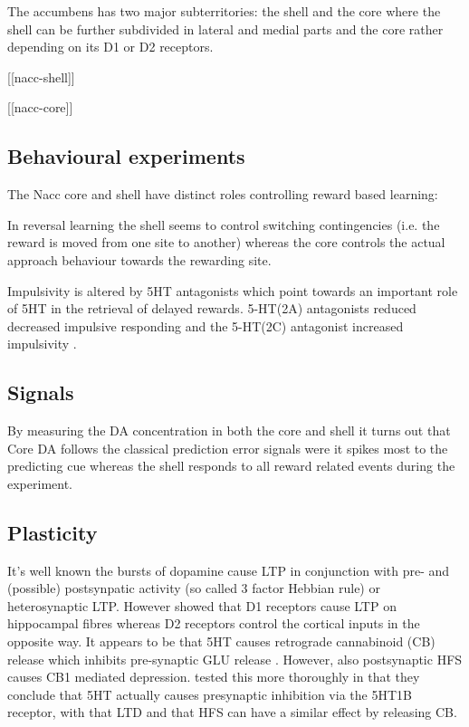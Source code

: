\documentclass[12pt,a4paper]{article}
\begin{document}
The accumbens has two major subterritories: the shell and the core 
\citep{heimer91} where the shell can be further subdivided \citep{Usuda1998} in lateral and medial parts and the core rather depending on its D1 or D2 receptors.

[[nacc-shell]]

[[nacc-core]]

\subsection{Behavioural experiments}

The Nacc core and shell have distinct roles controlling reward based learning:

In reversal learning \citep{Dalton2014} the shell seems to control switching contingencies (i.e. the reward is moved from one site to another) whereas the core controls the actual approach behaviour towards the rewarding site.

Impulsivity is altered by 5HT antagonists which point towards an important role of 5HT in the retrieval of delayed rewards. 5-HT(2A) antagonists reduced decreased impulsive responding and the 5-HT(2C) antagonist increased impulsivity \citep{Robinson2008}.

\subsection{Signals}

By measuring the DA concentration in both the core and shell \citep{Saddoris2015} it turns out that Core DA follows the classical prediction error signals were it spikes most to the predicting cue whereas the shell responds to all reward related events during the experiment.

\subsection{Plasticity}

It's well known the bursts of dopamine cause LTP in conjunction with pre- and (possible) postsynpatic activity (so called 3 factor Hebbian rule) or heterosynaptic LTP. However \citep{Goto2005} showed that D1 receptors cause LTP on hippocampal fibres whereas D2 receptors control the cortical inputs in the opposite way.
It appears to be that 5HT causes retrograde cannabinoid (CB) release which inhibits pre-synaptic GLU release \citep{Burattini2014}. However, also postsynaptic HFS causes CB1 mediated depression. \citep{Mathur2011} tested this more thoroughly in that they conclude that 5HT actually causes presynaptic inhibition via the 5HT1B receptor, with that LTD and that HFS can have a similar effect by releasing CB.
\end{document}
